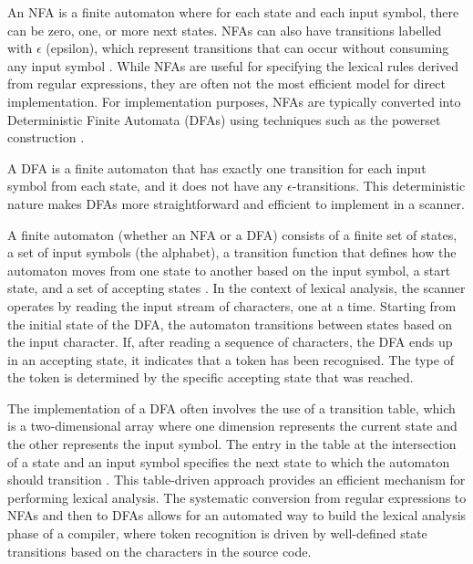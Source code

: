 An NFA is a finite automaton where for each state and each input symbol, there can be zero, one, or more next states. NFAs can also have transitions labelled with $\epsilon$ (epsilon), which represent transitions that can occur without consuming any input symbol \cite{aho2007compilers}. While NFAs are useful for specifying the lexical rules derived from regular expressions, they are often not the most efficient model for direct implementation. For implementation purposes, NFAs are typically converted into Deterministic Finite Automata (DFAs) using techniques such as the powerset construction \cite{aho2007compilers}. 

A DFA is a finite automaton that has exactly one transition for each input symbol from each state, and it does not have any $\epsilon$-transitions. This deterministic nature makes DFAs more straightforward and efficient to implement in a scanner.


A finite automaton (whether an NFA or a DFA) consists of a finite set of states, a set of input symbols (the alphabet), a transition function that defines how the automaton moves from one state to another based on the input symbol, a start state, and a set of accepting states \cite{aho2007compilers}. 
In the context of lexical analysis, the scanner operates by reading the input stream of characters, one at a time. Starting from the initial state of the DFA, the automaton transitions between states based on the input character. If, after reading a sequence of characters, the DFA ends up in an accepting state, it indicates that a token has been recognised. The type of the token is determined by the specific accepting state that was reached. 

The implementation of a DFA often involves the use of a transition table, which is a two-dimensional array where one dimension represents the current state and the other represents the input symbol. The entry in the table at the intersection of a state and an input symbol specifies the next state to which the automaton should transition \cite{aho2007compilers}. This table-driven approach provides an efficient mechanism for performing lexical analysis. The systematic conversion from regular expressions to NFAs and then to DFAs allows for an automated way to build the lexical analysis phase of a compiler, where token recognition is driven by well-defined state transitions based on the characters in the source code.

\pagebreak

